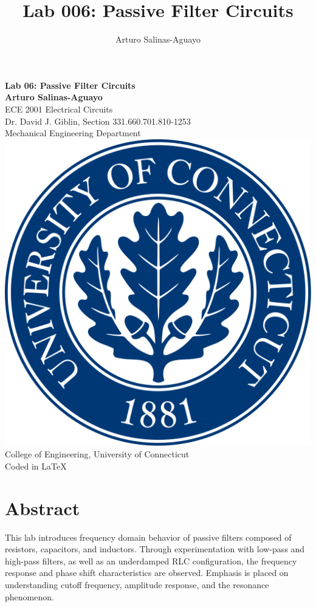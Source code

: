 \documentclass[12pt]{article}
\author{Arturo Salinas-Aguayo}
\title{Lab 006: Passive Filter Circuits}
\begin{document}
\newcommand{\closure}[2][3]{%
	{}\mkern#1mu\overline{\mkern-#1mu#2}}
\newcommand\ncoverline[1]{\mkern1mu\overline{\mkern-1mu#1\mkern-1mu}\mkern1mu}
\begin{titlepage}
	\centering
	\vspace*{3cm}
	\huge\textbf{Lab 06: Passive Filter Circuits}\\
	
	\vspace{5cm}
	\Large\textbf{Arturo Salinas-Aguayo}\\
	\normalsize
	ECE 2001 Electrical Circuits\\
	Dr. David J. Giblin, Section 331.660.701.810-1253\\
	Mechanical Engineering Department
	\vfill
	\includegraphics[scale=0.1]{uconnlogo}\\
	College of Engineering, University of Connecticut\\
	\scriptsize{Coded in \LaTeX}
	\vspace*{1cm}
\end{titlepage}
\tableofcontents
\newpage
\section{Abstract}
This lab introduces frequency domain behavior of passive filters composed of resistors, capacitors, and inductors. Through experimentation with low-pass and high-pass filters, as well as an underdamped RLC configuration, the frequency response and phase shift characteristics are observed. Emphasis is placed on understanding cutoff frequency, amplitude response, and the resonance phenomenon.
\end{document}
